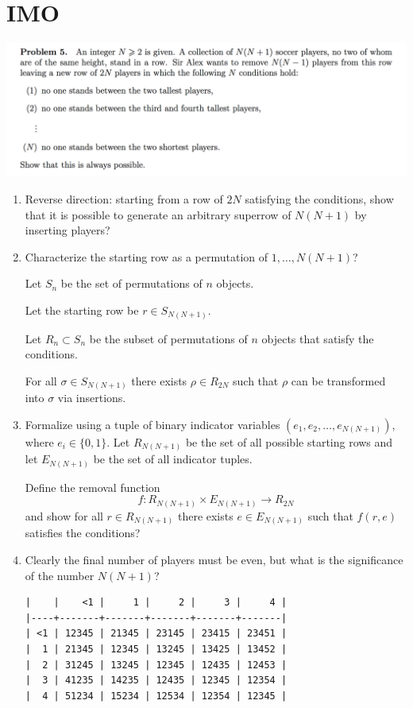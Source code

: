 \documentclass[12pt]{article}
\begin{document}
\section{IMO}

\newpage
\begin{mdframed}
\includegraphics[width=400pt]{img/puzzles-imo-2017-5.png}
\end{mdframed}

\begin{enumerate}
\item Reverse direction: starting from a row of $2N$ satisfying the conditions, show that it is
  possible to generate an arbitrary superrow of $N(N+1)$ by inserting players?
\item Characterize the starting row as a permutation of $1, \ldots, N(N+1)$?

  Let $S_n$ be the set of permutations of $n$ objects.

  Let the starting row be $r \in S_{N(N+1)}$.

  Let $R_n \subset S_n$ be the subset of permutations of $n$ objects that satisfy the conditions.

  \begin{claim*}
    For all $\sigma \in S_{N(N+1)}$ there exists $\rho \in R_{2N}$ such that $\rho$ can be
    transformed into $\sigma$ via insertions.
  \end{claim*}

\item Formalize using a tuple of binary indicator variables $(e_1, e_2, \ldots, e_{N(N+1)})$, where
  $e_i \in \{0, 1\}$. Let $R_{N(N+1)}$ be the set of all possible starting rows and let $E_{N(N+1)}$
    be the set of all indicator tuples.

  Define the removal function
  $$f:R_{N(N+1)} \times E_{N(N+1)} \to R_{2N}$$
  and show for all $r \in R_{N(N+1)}$ there exists $e \in E_{N(N+1)}$ such that $f(r, e)$ satisfies
  the conditions?
\item Clearly the final number of players must be even, but what is the significance of the number
  $N(N+1)$?

\begin{verbatim}
|    |    <1 |     1 |     2 |     3 |     4 |
|----+-------+-------+-------+-------+-------|
| <1 | 12345 | 21345 | 23145 | 23415 | 23451 |
|  1 | 21345 | 12345 | 13245 | 13425 | 13452 |
|  2 | 31245 | 13245 | 12345 | 12435 | 12453 |
|  3 | 41235 | 14235 | 12435 | 12345 | 12354 |
|  4 | 51234 | 15234 | 12534 | 12354 | 12345 |
\end{verbatim}
\end{enumerate}
\end{document}
